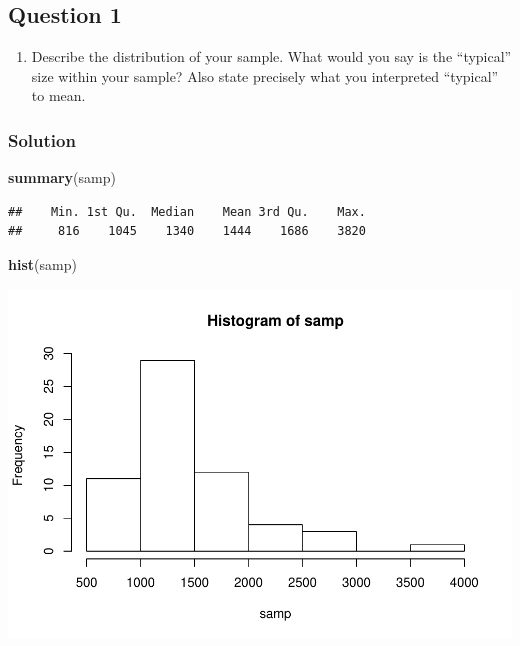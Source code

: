 \documentclass[]{article}
\newenvironment{Shaded}{\begin{snugshade}}{\end{snugshade}}
\newcommand{\KeywordTok}[1]{\textcolor[rgb]{0.13,0.29,0.53}{\textbf{#1}}}
\newcommand{\NormalTok}[1]{#1}
\providecommand{\tightlist}{%
  \setlength{\itemsep}{0pt}\setlength{\parskip}{0pt}}
\begin{document}
\subsection{Question 1}\label{question-1}

\begin{enumerate}
\def\labelenumi{\arabic{enumi}.}
\tightlist
\item
  Describe the distribution of your sample. What would you say is the
  ``typical'' size within your sample? Also state precisely what you
  interpreted ``typical'' to mean.
\end{enumerate}

\subsubsection{Solution}\label{solution}

\begin{Shaded}
\begin{Highlighting}[]
\KeywordTok{summary}\NormalTok{(samp)}
\end{Highlighting}
\end{Shaded}

\begin{verbatim}
##    Min. 1st Qu.  Median    Mean 3rd Qu.    Max. 
##     816    1045    1340    1444    1686    3820
\end{verbatim}

\begin{Shaded}
\begin{Highlighting}[]
\KeywordTok{hist}\NormalTok{(samp)}
\end{Highlighting}
\end{Shaded}

\includegraphics{DATA_606_Lab_4b_files/figure-latex/questone-1.pdf}
\end{document}
